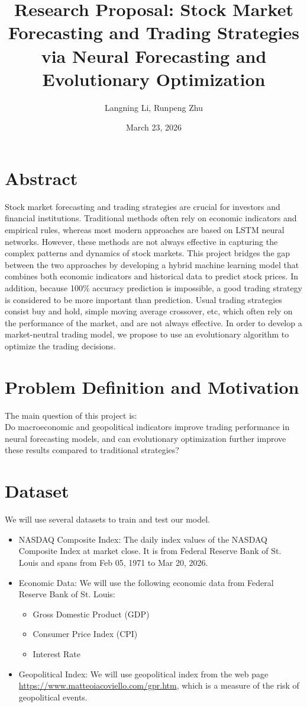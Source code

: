 \documentclass[12pt, a4paper]{article}
\title{Research Proposal: Stock Market Forecasting and Trading Strategies via Neural Forecasting and Evolutionary Optimization}
\author{Langning Li, Runpeng Zhu}
\date{March 23, 2026}
\begin{document}
\maketitle

\section{Abstract}
Stock market forecasting and trading strategies are crucial for investors and financial institutions. Traditional methods often rely on economic indicators and empirical rules, whereas most modern approaches are based on LSTM neural networks. However, these methods are not always effective in capturing the complex patterns and dynamics of stock markets. This project bridges the gap between the two approaches by developing a hybrid machine learning model that combines both economic indicators and historical data to predict stock prices. In addition, because 100\% accuracy prediction is impossible, a good trading strategy is considered to be more important than prediction. Usual trading strategies consist buy and hold, simple moving average crossover, etc, which often rely on the performance of the market, and are not always effective. In order to develop a market-neutral trading model, we propose to use an evolutionary algorithm to optimize the trading decisions.

\section{Problem Definition and Motivation}
The main question of this project is:\\
Do macroeconomic and geopolitical indicators improve trading performance in neural forecasting models, and can evolutionary optimization further improve these results compared to traditional strategies?

\section{Dataset}
We will use several datasets to train and test our model.
\begin{itemize}
    \item NASDAQ Composite Index: The daily index values of the NASDAQ Composite Index at market close. It is from Federal Reserve Bank of St. Louis and spans from Feb 05, 1971 to Mar 20, 2026.
    \item Economic Data: We will use the following economic data from Federal Reserve Bank of St. Louis:
    \begin{itemize}
        \item Gross Domestic Product (GDP)
        \item Consumer Price Index (CPI)
        \item Interest Rate
    \end{itemize}
    \item Geopolitical Index: We will use geopolitical index from the web page \url{https://www.matteoiacoviello.com/gpr.htm}, which is a measure of the risk of geopolitical events.
\end{itemize}
\end{document}
